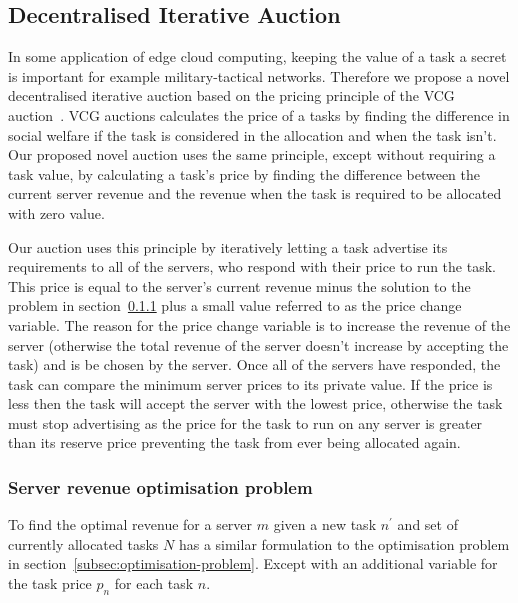 \subsection{Decentralised Iterative Auction}\label{subsec:decentralised-iterative-auction}
In some application of edge cloud computing, keeping the value of a task a secret is important for example
military-tactical networks. Therefore we propose a novel decentralised iterative auction based on the pricing principle
of the VCG auction~\citep{vickrey, Clarke, groves}. VCG auctions calculates the price of a tasks by finding the
difference in social welfare if the task is considered in the allocation and when the task isn't. Our proposed novel
auction uses the same principle, except without requiring a task value, by calculating a task's price by finding the
difference between the current server revenue and the revenue when the task is required to be allocated with zero value.

Our auction uses this principle by iteratively letting a task advertise its requirements to all of the servers, who
respond with their price to run the task. This price is equal to the server's current revenue minus the solution to the
problem in section~\ref{subsubsec:decentralised_iterative_problem} plus a small value referred to as the price change
variable. The reason for the price change variable is to increase the revenue of the server (otherwise the total
revenue of the server doesn't increase by accepting the task) and is be chosen by the server. Once all of the servers
have responded, the task can compare the minimum server prices to its private value. If the price is less then the
task will accept the server with the lowest price, otherwise the task must stop advertising as the price for the task
to run on any server is greater than its reserve price preventing the task from ever being allocated again.

\subsubsection{Server revenue optimisation problem}\label{subsubsec:decentralised_iterative_problem}
To find the optimal revenue for a server $m$ given a new task $n^{'}$ and set of currently allocated tasks $N$ has a
similar formulation to the optimisation problem in section~\ref{subsec:optimisation-problem}. Except with an additional
variable for the task price $p_n$ for each task $n$.

